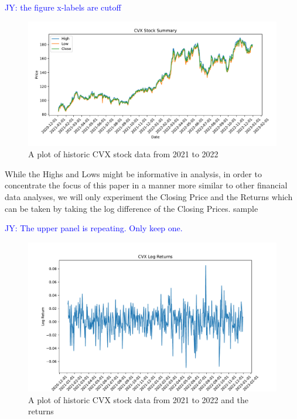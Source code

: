 \documentclass[12pt, letterpaper, titlepage]{article}
\newcommand{\jy}[1]{\textcolor{blue}{JY: #1}}
\begin{document}
\jy{the figure x-labels are cutoff}
\begin{figure}[!hb]
  \begin{center}
  \includegraphics[width=\textwidth]{../figures/fig1.pdf}
  \caption{A plot of historic CVX stock data from 2021 to 2022}\label{fig:fig1}
  \end{center}
\end{figure}


While the Highs and Lows might be informative in analysis, in order to concentrate the focus of this paper in a manner more similar to other financial data analyses, we will only experiment the Closing Price and the Returns which can be taken by taking the log difference of the Closing Prices. sample	

\jy{The upper panel is repeating. Only keep one.}
\begin{figure}[!hb]
  \begin{center}
  \includegraphics[width=\textwidth]{../figures/fig2.pdf}
  \caption{A plot of historic CVX stock data from 2021 to 2022 and the returns}\label{fig:fig2}
  \end{center}
\end{figure}
\end{document}

